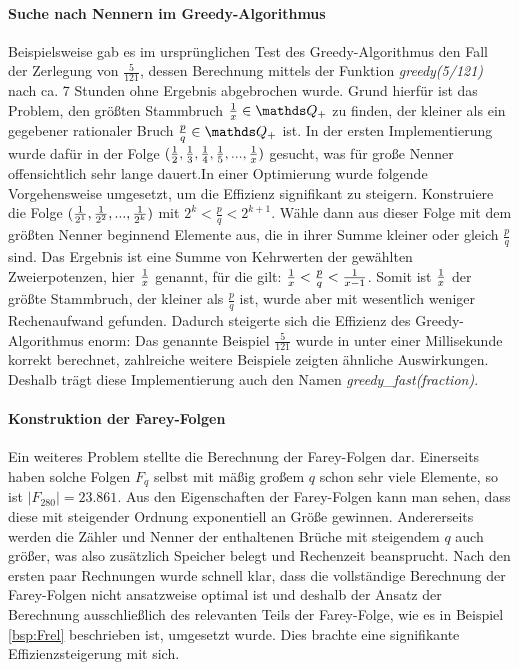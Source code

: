 \paragraph{Suche nach Nennern im Greedy-Algorithmus}Beispielsweise gab es im ursprünglichen Test des Greedy-Algorithmus den Fall der Zerlegung von $\frac{5}{121}$, dessen Berechnung mittels der Funktion \emph{greedy(5/121)} nach ca. 7 Stunden ohne Ergebnis abgebrochen wurde. Grund hierfür ist das Problem, den größten Stammbruch $\uf{x} \in \Q_+$ zu finden, der kleiner als ein gegebener rationaler Bruch $\frac{p}{q} \in \Q_+$ ist. In der ersten Implementierung wurde dafür in der Folge $(\frac{1}{2}, \frac{1}{3}, \frac{1}{4}, \frac{1}{5},...,\frac{1}{x})$ gesucht, was für große Nenner offensichtlich sehr lange dauert.In einer Optimierung wurde folgende Vorgehensweise umgesetzt, um die Effizienz signifikant zu steigern. Konstruiere die Folge $(\frac{1}{2^1}, \frac{1}{2^2}, ..., \frac{1}{2^k})$ mit $2^k < \frac{p}{q} < 2^{k+1}$. Wähle dann aus dieser Folge mit dem größten Nenner beginnend Elemente aus, die in ihrer Summe kleiner oder gleich $\frac{p}{q}$ sind. Das Ergebnis ist eine Summe von Kehrwerten der gewählten Zweierpotenzen, hier $\frac{1}{x}$ genannt, für die gilt: $\frac{1}{x} < \frac{p}{q} < \frac{1}{x-1}$. Somit ist $\frac{1}{x}$ der größte Stammbruch, der kleiner als $\frac{p}{q}$ ist, wurde aber mit wesentlich weniger Rechenaufwand gefunden.
Dadurch steigerte sich die Effizienz des Greedy-Algorithmus enorm: Das genannte Beispiel $\frac{5}{121}$ wurde in unter einer Millisekunde korrekt berechnet, zahlreiche weitere Beispiele zeigten ähnliche Auswirkungen. Deshalb trägt diese Implementierung auch den Namen \emph{greedy\_fast(fraction)}.

\paragraph{Konstruktion der Farey-Folgen}Ein weiteres Problem stellte die Berechnung der Farey-Folgen dar. Einerseits haben solche Folgen $F_q$ selbst mit mäßig großem $q$ schon sehr viele Elemente, so ist \zB $|F_{280}| = 23.861$. Aus den Eigenschaften der Farey-Folgen kann man sehen, dass diese mit steigender Ordnung exponentiell an Größe gewinnen. Andererseits werden die Zähler und Nenner der enthaltenen Brüche mit steigendem $q$ auch größer, was also zusätzlich Speicher belegt und Rechenzeit beansprucht. Nach den ersten paar Rechnungen wurde schnell klar, dass die vollständige Berechnung der Farey-Folgen nicht ansatzweise optimal ist und deshalb der Ansatz der Berechnung ausschließlich des relevanten Teils der Farey-Folge, wie es in Beispiel \ref{bsp:Frel} beschrieben ist, umgesetzt wurde. Dies brachte eine signifikante Effizienzsteigerung mit sich.



